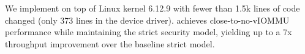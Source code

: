 
We implement \brand on top of Linux kernel 6.12.9
with fewer than 1.5k lines of code changed (only 373 lines in the device driver).
\brand achieves close-to-no-vIOMMU performance
while maintaining the strict security model,
yielding up to a 7x throughput improvement over the baseline strict model.

